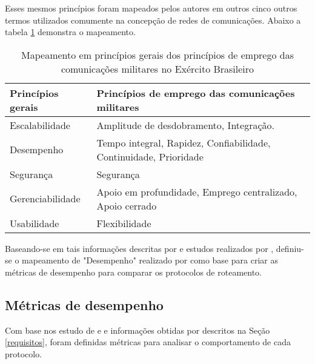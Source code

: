 Esses mesmos princ\'ipios foram mapeados pelos autores \cite{salles} em outros cinco outros termos utilizados comumente na concep\c{c}\~ao de redes de comunica\c{c}\~oes. Abaixo a tabela \ref{tabExer} demonstra o mapeamento.
\begin{table}[H]
	\centering
	\caption{Mapeamento em princ\'ipios gerais dos princ\'ipios de emprego das comunica\c{c}\~oes militares no Ex\'ercito Brasileiro \cite{salles}}
	\begin{tabular}{ | l | l | }
		\hline
		\textbf{Princ\'ipios gerais} & \textbf{Princ\'ipios de emprego das comunica\c{c}\~oes militares} \\ \hline
		Escalabilidade & Amplitude de desdobramento, Integra\c{c}\~ao. \\ \hline
		Desempenho & Tempo integral, Rapidez, Confiabilidade, Continuidade, Prioridade \\ \hline
		Seguran\c{c}a & Seguran\c{c}a \\ \hline
		Gerenciabilidade & Apoio em profundidade, Emprego centralizado, Apoio cerrado \\ \hline
		Usabilidade & Flexibilidade \\ \hline
	\end{tabular}
	\label{tabExer}
\end{table}

Baseando-se em tais informa\c{c}\~oes descritas por \cite{salles} e estudos realizados por \cite{pereira}, definiu-se o mapeamento de "Desempenho" realizado por \cite{salles} como base para criar as m\'etricas de desempenho para comparar os protocolos de roteamento.

\subsection{M\'etricas de desempenho}
Com base nos estudo de \cite{pereira} e \cite{schimidt} e informa\c{c}\~oes obtidas por \cite{salles} descritos na Se\c{c}\~ao \ref{requisitos}, foram definidas m\'etricas para analisar o comportamento de cada protocolo.

